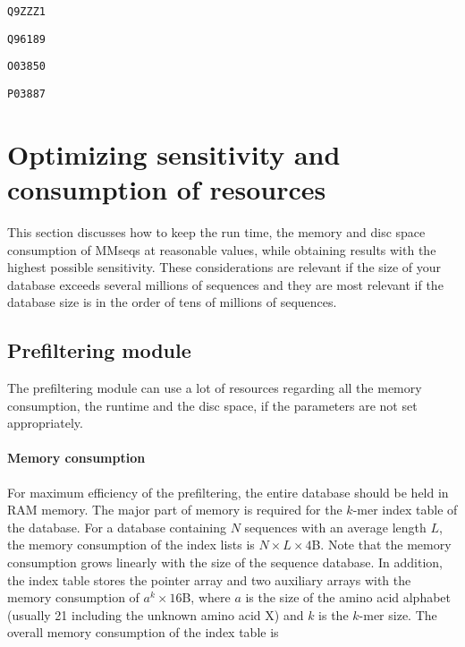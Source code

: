 \documentclass[11pt,a4paper]{report}
\begin{document}
\texttt{\footnotesize Q9ZZZ1 }{\footnotesize \par}

\texttt{\footnotesize Q96189 }{\footnotesize \par}

\texttt{\footnotesize O03850 }{\footnotesize \par}

\texttt{\footnotesize P03887 }{\footnotesize \par}


\section{Optimizing sensitivity and consumption of resources\label{sec:Sensitivity-and-consumption}}

This section discusses how to keep the run time, the memory and disc
space consumption of MMseqs at reasonable values, while obtaining
results with the highest possible sensitivity. These considerations
are relevant if the size of your database exceeds several millions
of sequences and they are most relevant if the database size is in
the order of tens of millions of sequences.


\subsection{Prefiltering module}

The prefiltering module can use a lot of resources regarding all the
memory consumption, the runtime and the disc space, if the parameters
are not set appropriately.


\paragraph{Memory consumption}

For maximum efficiency of the prefiltering, the entire database should
be held in RAM memory. The major part of memory is required for the
$k$-mer index table of the database. For a database containing $N$
sequences with an average length $L$, the memory consumption of the
index lists is $N\times L\times4$B. Note that the memory consumption
grows linearly with the size of the sequence database. In addition,
the index table stores the pointer array and two auxiliary arrays
with the memory consumption of $a^{k}\times16$B, where $a$ is the
size of the amino acid alphabet (usually 21 including the unknown
amino acid X) and $k$ is the $k$-mer size. The overall memory consumption
of the index table is
\end{document}
